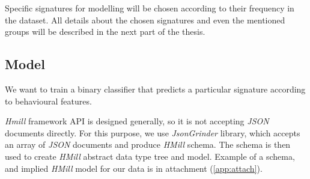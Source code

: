 Specific signatures for modelling will be chosen according to their frequency in the dataset. All details about the chosen signatures and even the mentioned groups will be described in the next part of the thesis.

\subsection{Model}
We want to train a binary classifier that predicts a particular signature according to behavioural features.

\emph{Hmill} framework API is designed generally, so it is not accepting \emph{JSON} documents directly. For this purpose, we use \emph{JsonGrinder} library, which accepts an array of \emph{JSON} documents and produce \emph{HMill} schema. The schema is then used to create \emph{HMill} abstract data type tree and model. Example of a schema, and implied \emph{HMill} model for our data is in attachment (\ref{app:attach}).







